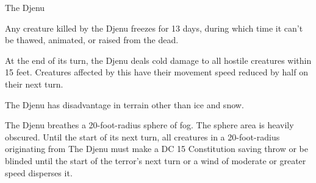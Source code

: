 \begin{DndMonster}[width=0.5\textwidth]{The Djenu}

    \DndMonsterBasics[
        armor-class = {16},
        hit-points  = {\DndDice{12d8 + 50}},
        speed       = {20 ft.},
      ]

    \DndMonsterAbilityScores[
        str = 16,
        dex = 10,
        con = 21,
        int = 4,
        wis = 13,
        cha = 7,
      ]

    \DndMonsterDetails[
        damage-immunities = {cold},
        senses = {passive Perception 11},
        condition-immunities = {exhaustion, frightened, paralyzed, petrified},
        challenge = 8,
      ]
      
      Any creature killed by the Djenu freezes for 13 days, during which time it can't be thawed, animated, or raised from the dead.
      
      At the end of its turn, the Djenu deals  cold damage to all hostile creatures within 15 feet. Creatures affected by this have their movement speed reduced by half on their next turn.
      
      The Djenu has disadvantage in terrain other than ice and snow.
      
      The Djenu breathes a 20-foot-radius sphere of fog. The sphere area is heavily obscured. Until the start of its next turn, all creatures in a 20-foot-radius originating from The Djenu must make a DC 15 Constitution saving throw or be blinded until the start of the terror's next turn or a wind of moderate or greater speed disperses it.
      
      \DndMonsterAttack[
      name=Shattering Claws,
      distance=melee, %
      mod=+3,
      reach=10,
      targets=one target,
      dmg=18,
      dmg-type=slashing,
    ]
      
\end{DndMonster}